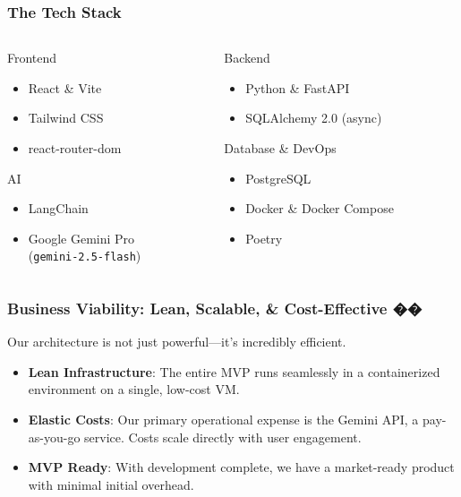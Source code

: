 \documentclass{beamer}
\begin{document}
\begin{frame}
  \frametitle{The Tech Stack}
  \begin{columns}[T] %
    \begin{column}{0.5\textwidth}
      \begin{block}{Frontend}
        \begin{itemize}
          \item React \& Vite
          \item Tailwind CSS
          \item react-router-dom
        \end{itemize}
      \end{block}
      \begin{block}{AI}
        \begin{itemize}
          \item LangChain
          \item Google Gemini Pro \\ (\texttt{gemini-2.5-flash})
        \end{itemize}
      \end{block}
    \end{column}
    \begin{column}{0.5\textwidth}
      \begin{block}{Backend}
        \begin{itemize}
          \item Python \& FastAPI
          \item SQLAlchemy 2.0 (async)
        \end{itemize}
      \end{block}
      \begin{block}{Database \& DevOps}
        \begin{itemize}
          \item PostgreSQL
          \item Docker \& Docker Compose
          \item Poetry
        \end{itemize}
      \end{block}
    \end{column}
  \end{columns}
\end{frame}

\begin{frame}
  \frametitle{Business Viability: Lean, Scalable, \& Cost-Effective ��}
  Our architecture is not just powerful—it's incredibly efficient.
  \begin{itemize}
    \item \textbf{Lean Infrastructure}: The entire MVP runs seamlessly in a containerized environment on a single, low-cost VM.
    \item \textbf{Elastic Costs}: Our primary operational expense is the Gemini API, a pay-as-you-go service. Costs scale directly with user engagement.
    \item \textbf{MVP Ready}: With development complete, we have a market-ready product with minimal initial overhead.
  \end{itemize}
\end{frame}
\end{document}
